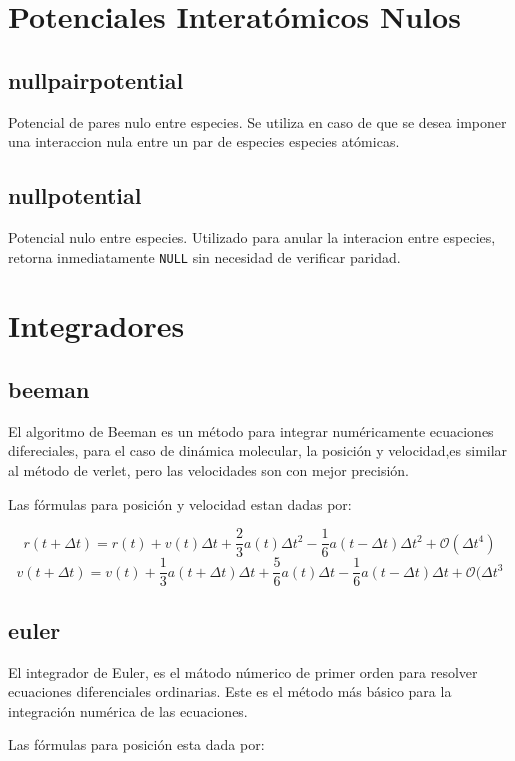 \section{Potenciales Interat\'omicos Nulos}
\subsection{nullpairpotential}
Potencial de pares nulo entre especies. Se utiliza en caso de que se desea imponer una interaccion nula entre un par de especies especies at\'omicas. 
\subsection{nullpotential}
Potencial nulo entre especies. Utilizado para anular la interacion entre especies, retorna inmediatamente \verb|NULL| sin necesidad de verificar paridad.

\section{Integradores}
\subsection{beeman}
El algoritmo de Beeman es un m\'etodo para integrar num\'ericamente ecuaciones difereciales, para el caso de din\'amica molecular, la posici\'on y velocidad,es similar al m\'etodo de verlet, pero las velocidades son con mejor precisi\'on.

Las f\'ormulas para posici\'on y velocidad estan dadas por:

$$r(t+\Delta t) = r(t) + v(t)\Delta t + \frac{2}{3}a(t)\Delta t^2 - \frac{1}{6}a(t-\Delta t)\Delta t^2 +\mathcal{O}(\Delta t^4)$$
$$v(t+\Delta t) = v(t) + \frac{1}{3}a(t+\Delta t)\Delta t+\frac{5}{6}a(t)\Delta t-\frac{1}{6}a(t-\Delta t)\Delta t+\mathcal{O}(\Delta t^3$$

\subsection{euler}
El integrador de Euler, es el m\'atodo n\'umerico de primer orden para resolver ecuaciones diferenciales ordinarias. Este es el m\'etodo m\'as b\'asico para la integraci\'on num\'erica de las ecuaciones.

Las f\'ormulas para posici\'on esta dada por:

